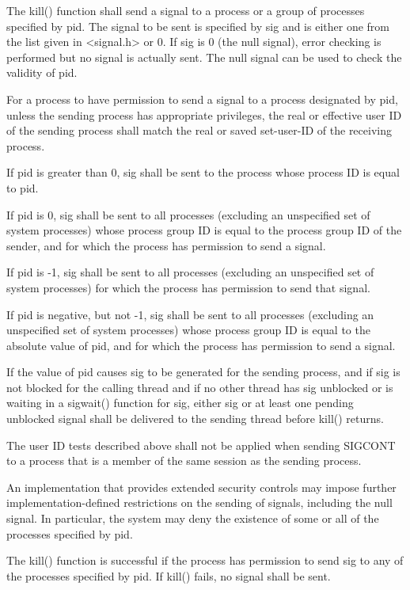 \begin{DoxyVerb}The kill() function shall send a signal to a process or a group of
processes specified by pid. The signal to be sent is specified by sig
and is either one from the list given in <signal.h> or 0. If sig is 0
(the null signal), error checking is performed but no signal is actually
sent. The null signal can be used to check the validity of pid.

For a process to have permission to send a signal to a process designated
by pid, unless the sending process has appropriate privileges, the real
or effective user ID of the sending process shall match the real or
saved set-user-ID of the receiving process.

If pid is greater than 0, sig shall be sent to the process whose process
ID is equal to pid.

If pid is 0, sig shall be sent to all processes (excluding an unspecified
set of system processes) whose process group ID is equal to the process
group ID of the sender, and for which the process has permission to send
a signal.

If pid is -1, sig shall be sent to all processes (excluding an unspecified
set of system processes) for which the process has permission to send
that signal.

If pid is negative, but not -1, sig shall be sent to all processes
(excluding an unspecified set of system processes) whose process group
ID is equal to the absolute value of pid, and for which the process has
permission to send a signal.

If the value of pid causes sig to be generated for the sending process,
and if sig is not blocked for the calling thread and if no other thread
has sig unblocked or is waiting in a sigwait() function for sig, either
sig or at least one pending unblocked signal shall be delivered to the
sending thread before kill() returns.

The user ID tests described above shall not be applied when sending
SIGCONT to a process that is a member of the same session as the sending
process.

An implementation that provides extended security controls may impose
further implementation-defined restrictions on the sending of signals,
including the null signal. In particular, the system may deny the
existence of some or all of the processes specified by pid.

The kill() function is successful if the process has permission to send
sig to any of the processes specified by pid. If kill() fails, no signal
shall be sent.
\end{DoxyVerb}


